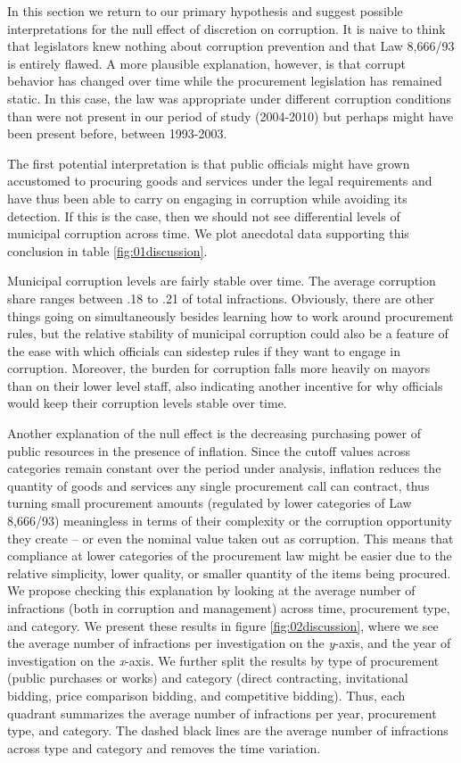 \documentclass[11pt]{article}
\begin{document}
In this section we return to our primary hypothesis and suggest possible interpretations for the null effect of discretion on corruption. It is naive to think that legislators knew nothing about corruption prevention and that Law 8,666/93 is entirely flawed. A more plausible explanation, however, is that corrupt behavior has changed over time while the procurement legislation has remained static. In this case, the law was appropriate under different corruption conditions than were not present in our period of study (2004-2010) but perhaps might have been present before, between 1993-2003.

The first potential interpretation is that public officials might have grown accustomed to procuring goods and services under the legal requirements and have thus been able to carry on engaging in corruption while avoiding its detection. If this is the case, then we should not see differential levels of municipal corruption across time. We plot anecdotal data supporting this conclusion in table \ref{fig:01discussion}.


Municipal corruption levels are fairly stable over time. The average corruption share ranges between .18 to .21 of total infractions. Obviously, there are other things going on simultaneously besides learning how to work around procurement rules, but the relative stability of municipal corruption could also be a feature of the ease with which officials can sidestep rules if they want to engage in corruption. Moreover, the burden for corruption falls more heavily on mayors \citep{AvisGovernmentAuditsReduce2018} than on their lower level staff, also indicating another incentive for why officials would keep their corruption levels stable over time.

Another explanation of the null effect is the decreasing purchasing power of public resources in the presence of inflation. Since the cutoff values across categories remain constant over the period under analysis, inflation reduces the quantity of goods and services any single procurement call can contract, thus turning small procurement amounts (regulated by lower categories of Law 8,666/93) meaningless in terms of their complexity or the corruption opportunity they create -- or even the nominal value taken out as corruption. This means that compliance at lower categories of the procurement law might be easier due to the relative simplicity, lower quality, or smaller quantity of the items being procured. We propose checking this explanation by looking at the average number of infractions (both in corruption and management) across time, procurement type, and category. We present these results in figure \ref{fig:02discussion}, where we see the average number of infractions per investigation on the \emph{y}-axis, and the year of investigation on the \emph{x}-axis. We further split the results by type of procurement (public purchases or works) and category (direct contracting, invitational bidding, price comparison bidding, and competitive bidding). Thus, each quadrant summarizes the average number of infractions per year, procurement type, and category. The dashed black lines are the average number of infractions across type and category and removes the time variation.
\end{document}
